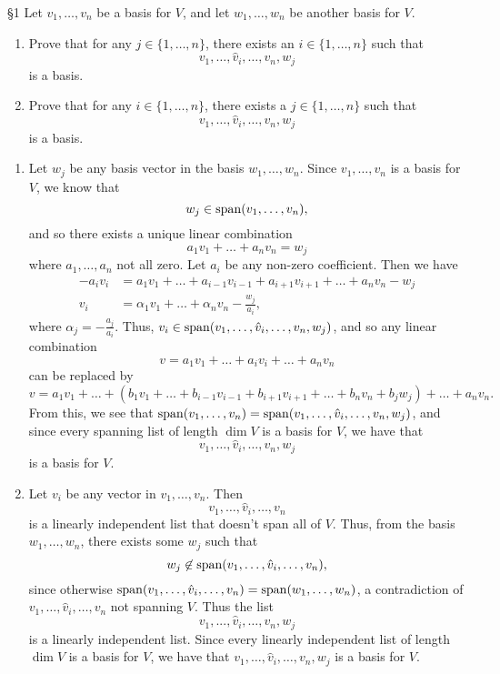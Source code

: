 \documentclass{homework}
\begin{document}
\begin{problem}{\S 1}
  Let $v_1,\ldots,v_n$ be a basis for $V$, and let $w_1,\ldots,w_n$ be another basis for $V$.
  \begin{enumerate}[label=(\alph*)]
    \item Prove that for any $j\in \{ 1,\ldots,n \}$, there exists an $i\in \{ 1,\ldots,n \}$ such
      that \[
        v_1,\ldots,\hat{v}_i,\ldots,v_n,w_j
      \] is a basis.
    \item Prove that for any $i\in \{ 1,\ldots,n \}$, there exists a $j\in \{ 1,\ldots,n \}$ such
      that \[
        v_1,\ldots,\hat{v}_i, \ldots,v_n, w_j
      \] is a basis.
  \end{enumerate}
\end{problem}

\begin{solution}
  \begin{enumerate}[label=(\alph*)]
    \item Let $w_j$ be any basis vector in the basis $w_1,\ldots,w_n$. Since $ v_1,\ldots,v_n$ is a
      basis for $V$, we know that \[
        w_j\in \operatorname{span}(v_1,\ldots,v_n)
      ,\] and so there exists a unique linear combination \[
        a_1v_1+\ldots+a_nv_n=w_j
      \] where $a_1,\ldots,a_n$ not all zero. Let $a_i$ be any non-zero coefficient. Then we have
      \begin{align*}
        -a_iv_i &= a_1v_1+\ldots+a_{i-1}v_{i-1}+a_{i+1}v_{i+1}+\ldots+a_nv_n-w_j\\
        v_i &= \alpha_1v_1+\ldots+\alpha_nv_n-\frac{w_j}{a_i}
      ,\end{align*} where $\alpha_j = -\frac{a_j}{a_i}$. Thus, $v_i\in
      \operatorname{span}(v_1,\ldots,\hat{v}_i,\ldots,v_n,w_j)$, and so any linear combination \[
        v = a_1v_1+\ldots+a_iv_i+\ldots+a_nv_n
      \] can be replaced by \[
        v = a_1v_1+\ldots+(b_1v_1+\ldots+b_{i-1}v_{i-1}+b_{i+1}v_{i+1}+\ldots+b_nv_n+b_jw_j)+\ldots+a_nv_n
      .\] From this, we see that $\operatorname{span}(v_1,\ldots,v_n)=\operatorname{span}(v_1,\ldots,\hat{v}_i,\ldots,v_n,w_j)$,
      and since every spanning list of length $\dim V$ is a basis for $V$, we have that \[
        v_1,\ldots,\hat{v}_i,\ldots,v_n,w_j
      \] is a basis for $V$.

    \item Let $v_i$ be any vector in $ v_1,\ldots,v_n$. Then \[
      v_1,\ldots,\hat{v}_i,\ldots,v_n
    \] is a linearly independent list that doesn't span all of $V$. Thus, from the basis $
    w_1,\ldots,w_n$, there exists some $w_j$ such that \[
      w_j\not\in \operatorname{span}(v_1,\ldots,\hat{v}_i,\ldots,v_n)
    ,\] since otherwise $\operatorname{span}(v_1,\ldots,\hat{v}_i,\ldots,v_n)=\operatorname{span}(w_1,\ldots,w_n)$, a
    contradiction of $v_1,\ldots,\hat{v}_i,\ldots,v_n$ not spanning $V$. Thus the list \[
      v_1,...,\hat{v}_i,\ldots,v_n,w_j
    \] is a linearly independent list. Since every linearly independent list of length $\dim V$ is a
    basis for $V$, we have that $v_1,\ldots,\hat{v}_i,\ldots,v_n,w_j$ is a basis for $V$.
  \end{enumerate}
\end{solution}
\end{document}
